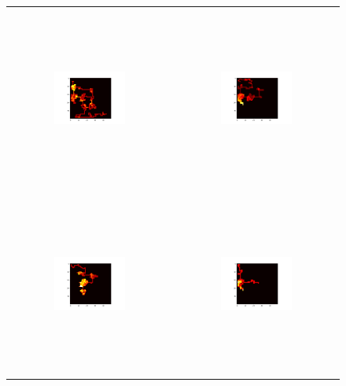 \begin{figure}[h!]
    \begin{center}
        \begin{tabular}{cc}
            \includegraphics[width=0.45\textwidth, height=60mm]{images/test1_agent1.png}
            & 
            \includegraphics[width=0.45\textwidth, height=60mm]{images/test2_agent1.png}    
            \\
            \includegraphics[width=0.45\textwidth, height=60mm]{images/test1_agent2.png}
            &
            \includegraphics[width=0.45\textwidth, height=60mm]{images/test2_agent2.png}

\end{tabular}
\end{center}
\end{figure}
